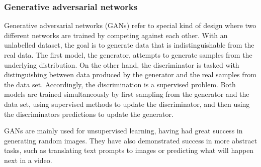 \subsubsection{Generative adversarial networks}
Generative adversarial networks (GANs) refer to special kind of design where two different networks are trained by competing against each other.
With an unlabelled dataset, the goal is to generate data that is indistinguishable from the real data.
The first model, the generator, attempts to generate samples from the underlying distribution.
On the other hand, the discriminator is tasked with distinguishing between data produced by the generator and the real samples from the data set.
Accordingly, the discrimination is a supervised problem.
Both models are trained simultaneously by first sampling from the generator and the data set, using supervised methods to update the discriminator, and then using the discriminators predictions to update the generator.

GANs are mainly used for unsupervised learning, having had great success in generating random images.
They have also demonstrated success in more abstract tasks, such as translating text prompts to images or predicting what will happen next in a video.